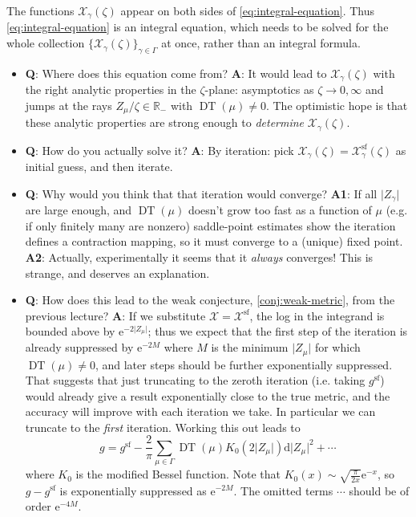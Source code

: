 \documentclass[12pt,letterpaper,reqno]{article}
\numberwithin{equation}{section}
\newcommand{\cX}{\ensuremath{\mathcal X}}
\newcommand{\bbR}{\ensuremath{\mathbb R}}
\newcommand{\e}{{\mathrm e}}
\newcommand{\de}{\mathrm{d}}
\renewcommand{\sf}{\mathrm{sf}}
\newcommand{\abs}[1]{\lvert#1\rvert}
\newcommand{\ti}[1]{\textit{#1}}
\DeclareMathOperator{\DT}{DT}
\begin{document}
The functions $\cX_\gamma(\zeta)$ appear on both sides of
\eqref{eq:integral-equation}. Thus \eqref{eq:integral-equation} is an integral equation, which needs to be solved for 
the whole collection $\{\cX_\gamma(\zeta)\}_{\gamma \in \Gamma}$
at once, rather than an integral formula.

\begin{itemize}
  \item {\bf Q}: Where does this equation come from? {\bf A}: It would lead to $\cX_\gamma(\zeta)$ with
  the right analytic properties in the $\zeta$-plane: asymptotics as $\zeta \to 0,\infty$
  and jumps at the rays $Z_\mu / \zeta \in \bbR_-$ with $\DT(\mu) \neq 0$.
  The optimistic hope is that these analytic properties are strong enough
  to \ti{determine} $\cX_\gamma(\zeta)$.

  \item {\bf Q}: How do you actually solve it? {\bf A}: By iteration: pick
  $\cX_\gamma(\zeta) = \cX_\gamma^\sf(\zeta)$ as initial guess, 
  and then iterate.

  \item {\bf Q}: Why would you think that that iteration would converge?
  {\bf A1}: If all $\abs{Z_\gamma}$ are large enough, and $\DT(\mu)$ doesn't grow too fast
  as a function of $\mu$ (e.g. if only finitely many are nonzero)
  saddle-point estimates show 
  the iteration defines a contraction mapping, so it must
  converge to a (unique) fixed point.
  {\bf A2}: Actually, experimentally it seems that
  it \ti{always} converges! This is strange, and
  deserves an explanation.

  \item {\bf Q}: How does this lead to the weak
  conjecture, \autoref{conj:weak-metric}, from the previous lecture? {\bf A}: 
  If we substitute $\cX = \cX^\sf$, the log in the
  integrand is bounded above by $\e^{-2 \abs{Z_\mu}}$;
  thus we expect that the first step of the iteration is already
  suppressed by $\e^{-2 M}$ where $M$ is the minimum $\abs{Z_\mu}$
  for which $\DT(\mu) \neq 0$, and later steps
  should be further exponentially suppressed. That suggests
  that just truncating to the zeroth iteration (i.e. taking $g^\sf$)
  would already give a result exponentially close to the true metric,
  and the accuracy will improve with each iteration we take.
  In particular we can truncate to the \ti{first} iteration.
  Working this out leads to
  \begin{equation}
    g = g^\sf - \frac{2}{\pi} \sum_{\mu \in \Gamma} \DT(\mu) K_0\left( 2 \abs{Z_\mu} \right) \de \abs{Z_\mu}^2 + \cdots
  \end{equation}
  where $K_0$ is the modified Bessel function.
  Note that $K_0(x) \sim \sqrt{\frac{\pi}{2x}} \e^{-x}$,
  so $g - g^\sf$ is exponentially suppressed as $\e^{-2M}$.
  The omitted terms $\cdots$ should be of order $\e^{-4M}$.
\end{itemize}
\end{document}
